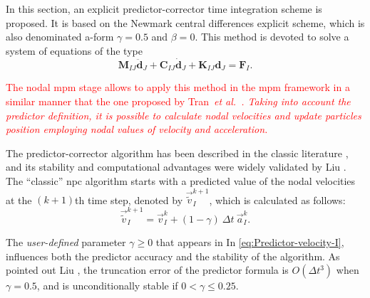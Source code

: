 \documentclass[preprint,12pt,a4paper]{elsarticle}
\newcommand{\Matrix}[1]{
  \ensuremath{\mathbf{{#1}}}
}
\newcommand{\Vector}[1]{
  \ensuremath{\mathbf{{#1}}}
}
\newcommand{\PNA}[1]{
  \textcolor{red}{{#1}}
}
\begin{document}
In this section, an explicit predictor-corrector time integration
scheme is proposed. It is based on the Newmark central differences explicit scheme, which is also denominated a-form 
$\gamma = 0.5$ and $\beta = 0$. This method is devoted to solve a system of equations of the type
\begin{equation*}
  \Matrix{M}_{IJ}\ddot{\Vector{d}}_{J} + \Matrix{C}_{IJ}\dot{\Vector{d}}_{J} +
  \Matrix{K}_{IJ}\Vector{d}_{J} = \Vector{F}_{I}.
\end{equation*}
\PNA{The nodal \acrshort{mpm} stage allows to apply this method
in the \acrshort{mpm} framework in a similar manner that the one
proposed by Tran~\it{et al.}~\cite{Tran2019e}. Taking into account the predictor definition, it is possible to calculate
nodal velocities and update particles position employing nodal values
of velocity and acceleration.} 

The predictor-corrector algorithm has
been described in the classic literature \cite{Hughes2000}, and its
stability and computational advantages were widely validated by Liu
\cite{Xiaojian94}. The ``classic'' \acrfull{npc} algorithm starts with a
predicted value of the nodal velocities at the $(k+1)$th time step, denoted by $\vec{\tilde{v}}_I^{k+1}$, which is calculated as follows:
\begin{equation}
  \label{eq:Predictor-velocity-I}
  \vec{\tilde{v}}_I^{k+1} = \vec{v}_I^k + (1 - \gamma)\ \Delta t\ \vec{a}_I^k.
\end{equation}

The \textit{user-defined}
parameter $\gamma \geq 0$ that appears in In \eqref{eq:Predictor-velocity-I}, influences both the predictor accuracy
and the stability of the algorithm. As pointed out Liu
\cite{Xiaojian94}, the truncation error of the predictor formula is
$O(\Delta t^3)$ when $\gamma = 0.5$, and is unconditionally stable if
$ 0 < \gamma \leq 0.25$.
\end{document}
